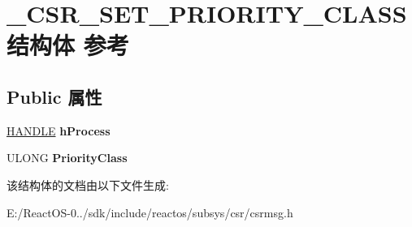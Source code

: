 \hypertarget{struct___c_s_r___s_e_t___p_r_i_o_r_i_t_y___c_l_a_s_s}{}\section{\+\_\+\+C\+S\+R\+\_\+\+S\+E\+T\+\_\+\+P\+R\+I\+O\+R\+I\+T\+Y\+\_\+\+C\+L\+A\+S\+S结构体 参考}
\label{struct___c_s_r___s_e_t___p_r_i_o_r_i_t_y___c_l_a_s_s}
\subsection*{Public 属性}
\begin{DoxyCompactItemize}
\item 
\mbox{\label{struct___c_s_r___s_e_t___p_r_i_o_r_i_t_y___c_l_a_s_s_a9a97bc4abd37e4c633c5e8ec5ee1331a}} 
\hyperlink{interfacevoid}{H\+A\+N\+D\+LE} {\bfseries h\+Process}
\item 
\mbox{\label{struct___c_s_r___s_e_t___p_r_i_o_r_i_t_y___c_l_a_s_s_a94aa63ed5f41761cf51ee4436df40711}} 
U\+L\+O\+NG {\bfseries Priority\+Class}
\end{DoxyCompactItemize}


该结构体的文档由以下文件生成\+:\begin{DoxyCompactItemize}
\item 
E\+:/\+React\+O\+S-\/0../sdk/include/reactos/subsys/csr/csrmsg.\+h\end{DoxyCompactItemize}
